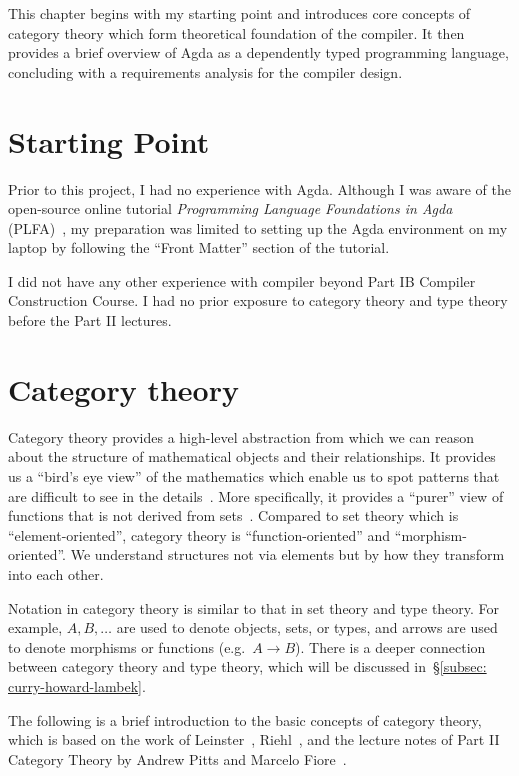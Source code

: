\documentclass[12pt,a4paper]{report}
\theoremstyle{definition}
\newcommand{\secref}[1]{\S\ref{#1}}
\begin{document}
    This chapter begins with my starting point and introduces core concepts of category theory which form theoretical foundation of the compiler. It then provides a brief overview of Agda as a dependently typed programming language, concluding with a requirements analysis for the compiler design.

    \section{Starting Point}
    Prior to this project, I had no experience with Agda. Although I was aware of the open-source online tutorial \textit{Programming Language Foundations in Agda} (PLFA)~\autocite{plfa}, my preparation was limited to setting up the Agda environment on my laptop by following the ``Front Matter'' section of the tutorial.

    I did not have any other experience with compiler beyond Part IB Compiler Construction Course. I had no prior exposure to category theory and type theory before the Part II lectures.


    \section{Category theory} \label{sec: cat}
        Category theory provides a high-level abstraction from which we can reason about the structure of mathematical objects and their relationships. It provides us a ``bird's eye view'' of the mathematics which enable us to spot patterns that are difficult to see in the details~\autocite{basic_cat}. More specifically, it provides a ``purer'' view of functions that is not derived from sets~\autocite{scott-lambda}. Compared to set theory which is ``element-oriented'', category theory is ``function-oriented'' and ``morphism-oriented''. We understand structures not via elements but by how they transform into each other. 

        Notation in category theory is similar to that in set theory and type theory. For example, $A, B, \dots$ are used to denote objects, sets, or types, and arrows are used to denote morphisms or functions (e.g.\ $A \to B$). There is a deeper connection between category theory and type theory, which will be discussed in~\secref{subsec: curry-howard-lambek}. 

        The following is a brief introduction to the basic concepts of category theory, which is based on the work of Leinster~\autocite{basic_cat}, 
        Riehl~\autocite{cat_context}, and the lecture notes of Part II Category Theory by Andrew Pitts and Marcelo Fiore~\autocite{cat_lecture_notes}.
\end{document}
